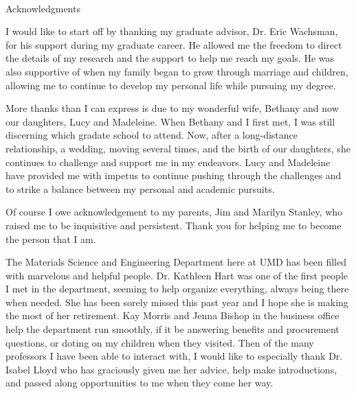 

\renewcommand{\baselinestretch}{2}
\small\normalsize
\hbox{\ }

\vspace{-.65in}

\begin{center}
\large{Acknowledgments}
\end{center}

\vspace{1ex}

I would like to start off by thanking my graduate advisor, Dr. Eric Wachsman, for his support during my graduate career.
He allowed me the freedom to direct the details of my research and the support to help me reach my goals.
He was also supportive of when my family began to grow through marriage and children, allowing me to continue to develop my personal life while pursuing my degree.

More thanks than I can express is due to my wonderful wife, Bethany and now our daughters, Lucy and Madeleine.
When Bethany and I first met, I was still discerning which gradate school to attend.
Now, after a long-distance relationship, a wedding, moving several times, and the birth of our daughters, she continues to challenge and support me in my endeavors.
Lucy and Madeleine have provided me with impetus to continue pushing through the challenges and to strike a balance between my personal and academic pursuits.

Of course I owe acknowledgement to my parents, Jim and Marilyn Stanley, who raised me to be inquisitive and persistent.
Thank you for helping me to become the person that I am.

The Materials Science and Engineering Department here at UMD has been filled with marvelous and helpful people.
Dr. Kathleen Hart was one of the first people I met in the department, seeming to help organize everything, always being there when needed.
She has been sorely missed this past year and I hope she is making the most of her retirement.
Kay Morris and Jenna Bishop in the business office help the department run smoothly, if it be answering benefits and procurement questions, or doting on my children when they visited.
Then of the many professors I have been able to interact with, I would like to especially thank Dr. Isabel Lloyd who has graciously given me her advice, help make introductions, and passed along opportunities to me when they come her way.

